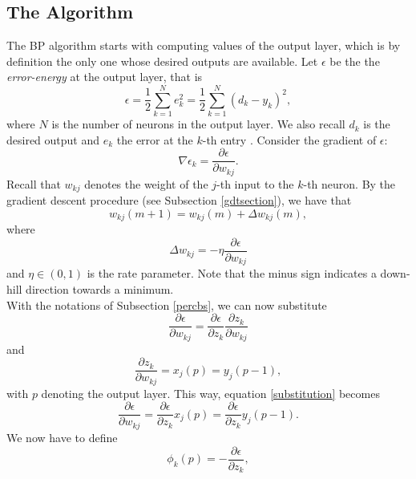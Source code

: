 \documentclass[%
    corpo=11pt,
    twoside,
    stile=classica,
    oldstyle,
    autoretitolo,
    tipotesi=magistrale,
    greek,
    evenboxes,
    english
]{toptesi}
\begin{document}
\subsection{The Algorithm}
The BP algorithm starts with computing values of the output layer, which is by definition the only one whose desired outputs are available. Let $\epsilon$ be the the \textit{error-energy} at the output layer, that is
\begin{equation}
\label{errorenergy}
\epsilon = \frac{1}{2}\sum_{k=1}^{N}e_k^2  =\frac{1}{2}\sum_{k=1}^{N}\left(d_k - y_k\right)^2,
\end{equation}
where $N$ is the number of neurons in the output layer. We also recall $d_k$ is the desired output and $e_k$ the error at the $k$-th entry . Consider the gradient of $\epsilon$:
\begin{equation}
\nabla \epsilon_k = \frac{\partial \epsilon}{\partial w_{kj}}.
\end{equation}
Recall that $w_{kj}$ denotes the weight of the $j$-th input to the $k$-th neuron. By the gradient descent procedure (see Subsection \ref{gdtsection}), we have that 
\begin{equation}
w_{kj}(m+1) = w_{kj}(m) + \Delta w_{kj}(m),
\end{equation}
where 
\begin{equation}
\label{deltasub}
\Delta w_{kj} = -\eta \frac{\partial \epsilon}{\partial w_{kj}}
\end{equation}
and $\eta \in \left(0,1 \right)$ is the rate parameter. Note that the minus sign indicates a down-hill direction towards a minimum. \\
With the notations of Subsection \ref{percbs}, we can now substitute 
\begin{equation}
\label{substitution}
\frac{\partial \epsilon}{\partial w_{kj}} = \frac{\partial \epsilon}{\partial z_k} \frac{\partial z_k}{\partial w_{kj}}
\end{equation}
and 
\begin{equation}
\label{graupe6p8}
\frac{\partial z_k}{\partial w_{kj}} = x_j(p) = y_j(p -1),
\end{equation}
with $p$ denoting the output layer. This way, equation \eqref{substitution} becomes 
\begin{equation}
\label{newsubstitution}
\frac{\partial \epsilon}{\partial w_{kj}} = \frac{\partial \epsilon}{\partial z_k}x_j(p) = \frac{\partial \epsilon}{\partial z_k} y_j(p-1).
\end{equation}
We now have to define 
\begin{equation}
\label{phisub}
\phi_k(p) = - \frac{\partial \epsilon}{\partial z_k},
\end{equation}
\end{document}
